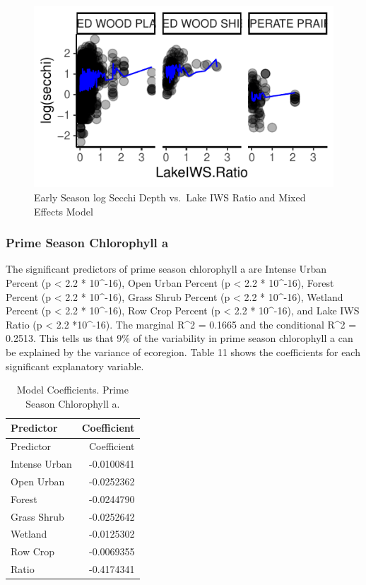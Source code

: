 \documentclass[12pt,]{article}
\begin{document}
\begin{figure}
\centering
\includegraphics{Bollt_Greif_Raby_Roth_Project_Final_files/figure-latex/unnamed-chunk-22-1.pdf}
\caption{Early Season log Secchi Depth vs.~Lake IWS Ratio and Mixed
Effects Model}
\end{figure}

\hypertarget{prime-season-chlorophyll-a}{%
\subsubsection{Prime Season Chlorophyll
a}\label{prime-season-chlorophyll-a}}

The significant predictors of prime season chlorophyll a are Intense
Urban Percent (p \textless{} 2.2 * 10\^{}-16), Open Urban Percent (p
\textless{} 2.2 * 10\^{}-16), Forest Percent (p \textless{} 2.2 *
10\^{}-16), Grass Shrub Percent (p \textless{} 2.2 * 10\^{}-16), Wetland
Percent (p \textless{} 2.2 * 10\^{}-16), Row Crop Percent (p \textless{}
2.2 * 10\^{}-16), and Lake IWS Ratio (p \textless{} 2.2 *10\^{}-16). The
marginal R\^{}2 = 0.1665 and the conditional R\^{}2 = 0.2513. This tells
us that 9\% of the variability in prime season chlorophyll a can be
explained by the variance of ecoregion. Table 11 shows the coefficients
for each significant explanatory variable.

\begin{longtable}[]{@{}lr@{}}
\caption{Model Coefficients. Prime Season Chlorophyll a.}\tabularnewline
\toprule
Predictor & Coefficient\tabularnewline
\midrule
\endfirsthead
\toprule
Predictor & Coefficient\tabularnewline
\midrule
\endhead
Intense Urban & -0.0100841\tabularnewline
Open Urban & -0.0252362\tabularnewline
Forest & -0.0244790\tabularnewline
Grass Shrub & -0.0252642\tabularnewline
Wetland & -0.0125302\tabularnewline
Row Crop & -0.0069355\tabularnewline
Ratio & -0.4174341\tabularnewline
\bottomrule
\end{longtable}
\end{document}
